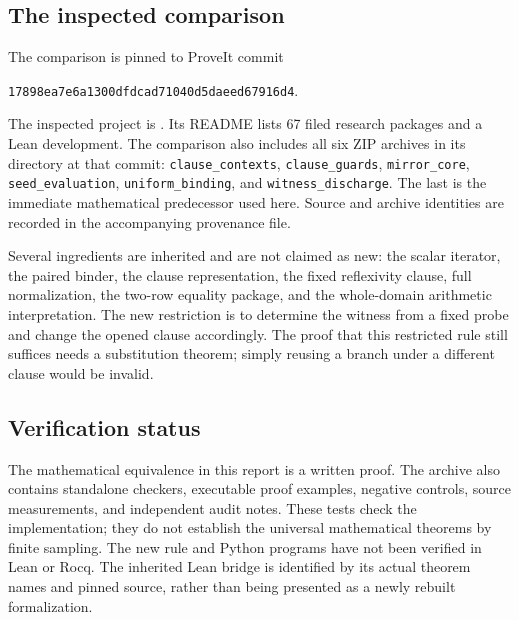 \documentclass[11pt,letterpaper]{article}
\theoremstyle{definition}
\begin{document}
\subsection{The inspected comparison}

The comparison is pinned to ProveIt commit
\begin{center}
\texttt{17898ea7e6a1300dfdcad71040d5daeed67916d4}.
\end{center}
The inspected project is
.
Its README lists 67 filed research packages and a Lean development.\cite{baseline}
The comparison also includes all six ZIP archives in its
 directory at that commit:
\texttt{clause\_contexts}, \texttt{clause\_guards},
\texttt{mirror\_core}, \texttt{seed\_evaluation},
\texttt{uniform\_binding}, and \texttt{witness\_discharge}.
The last is the immediate mathematical predecessor used here.\cite{wd} Source and
archive identities are recorded in the accompanying provenance file.

Several ingredients are inherited and are not claimed as new:
the scalar iterator, the paired binder, the clause representation, the
fixed reflexivity clause, full normalization, the two-row equality package,
and the whole-domain arithmetic interpretation.  The new restriction is to
determine the witness from a fixed probe and change the opened clause
accordingly.  The proof that this restricted rule still suffices needs a
substitution theorem; simply reusing a branch under a different clause
would be invalid.

\subsection{Verification status}

The mathematical equivalence in this report is a written proof.  The archive
also contains standalone checkers, executable proof examples, negative
controls, source measurements, and independent audit notes.  These tests
check the implementation; they do not establish the universal mathematical
theorems by finite sampling.  The new rule and Python programs have not been
verified in Lean or Rocq.  The inherited Lean bridge is identified by its
actual theorem names and pinned source, rather than being presented as a
newly rebuilt formalization.


\end{document}
